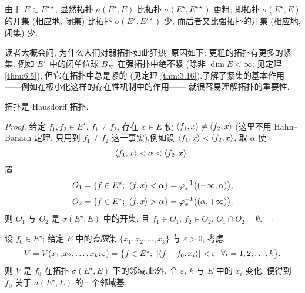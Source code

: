 由于 $E\subset E^{\star\star}$, 显然拓扑 $\sigma(E^\star,E)$ 比拓扑
$\sigma(E^\star,E^{\star\star})$ 更粗; 即拓扑 $\sigma(E^\star,E)$ 的开集
(相应地, 闭集) 比拓扑 $\sigma(E^\star,E^{\star\star})$ 少, 而后者又比强拓扑的开集
(相应地, 闭集) 少.

\begin{remark}
\label{rem:3.8}
读者大概会问, 为什么人们对弱拓扑如此狂热! 原因如下: 更粗的拓扑有更多的紧集.
例如 $E^\star$ 中的闭单位球 $B_{E^\star}$ 在强拓扑中绝不紧 (除非
$\dim E<\infty$; 见定理  \ref{thm:6.5}), 但它在\wstar{}拓扑中总是紧的 (见定理
 \ref{thm:3.16}).了解了紧集的基本作用——例如在极小化这样的存在性机制中的作用——
就很容易理解\wstar{}拓扑的重要性.
\end{remark}

\begin{proposition}
\label{prop:3.11}
\wstar{}拓扑是 Hausdorff 拓扑.
\end{proposition}

\begin{proof}
给定 $f_1,f_2\in E^\star$, $f_1\ne f_2$, 存在 $x\in E$ 使
$\left\langle f_1,x\right\rangle\ne\left\langle f_2,x\right\rangle$ (这里不用 Hahn--Banach 定理, 只用到 $f_1\ne f_2$
这一事实).例如设 $\left\langle f_1,x\right\rangle<\left\langle f_2,x\right\rangle$, 取 $\alpha$ 使
\begin{equation*}
\left\langle f_1,x\right\rangle<\alpha<\left\langle f_2,x\right\rangle.
\end{equation*}
置
\begin{equation*}
O_1=\{f\in E^\star;\ \dual{f}{x}<\alpha\}=\varphi_x^{-1}\bigl((-\infty,\alpha)\bigr),
\end{equation*}
\begin{equation*}
O_2=\{f\in E^\star;\ \dual{f}{x}>\alpha\}=\varphi_x^{-1}\bigl((\alpha,+\infty)\bigr).
\end{equation*}
则 $O_1$ 与 $O_2$ 是 $\sigma(E^\star,E)$ 中的开集, 且 $f_1\in O_1$, $f_2\in O_2$,
$O_1\cap O_2=\emptyset$.
\end{proof}

\begin{proposition}
\label{prop:3.12}
设 $f_0\in E^\star$; 给定 $E$ 中的\emph{有限}集 $\{x_1,x_2,\dots,x_k\}$ 与
$\varepsilon>0$, 考虑
\begin{equation*}
V=V(x_1,x_2,\dots,x_k;\varepsilon)
=\bigl\{f\in E^\star;\ \left|\left\langle f-f_0,x_i\right\rangle\right|<\varepsilon\ \ \forall i=1,2,\dots,k\bigr\}.
\end{equation*}
则 $V$ 是 $f_0$ 在拓扑 $\sigma(E^\star,E)$ 下的邻域.此外, 令 $\varepsilon$, $k$ 与
$E$ 中的 $x_i$ 变化, 便得到 $f_0$ 关于 $\sigma(E^\star,E)$ 的一个邻域基.
\end{proposition}

